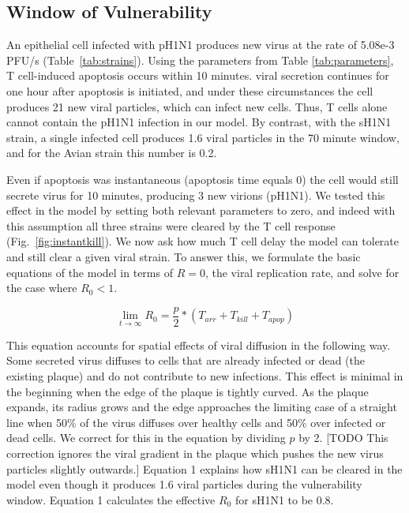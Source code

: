 \documentclass[10pt]{article}
\begin{document}
\subsection*{Window of Vulnerability}

An epithelial cell infected with pH1N1 produces new virus at the rate of 5.08e-3 PFU/s (Table~\ref{tab:strains}).  Using the parameters from Table \ref{tab:parameters}, T cell-induced apoptosis occurs within 10 minutes. viral secretion continues for one hour after apoptosis is initiated, and under these circumstances the cell produces 21 new viral particles, which can infect new cells.  Thus, T cells alone cannot contain the pH1N1 infection in our model.  By contrast, with the sH1N1 strain, a single infected cell produces 1.6 viral particles in the 70 minute window, and for the Avian strain this number is 0.2.  %

Even if apoptosis was instantaneous (apoptosis time equals 0) the cell would still secrete virus for 10 minutes, producing 3 new virions (pH1N1).  We tested this effect in the model by setting both relevant parameters to zero, and indeed with this assumption all three strains were cleared by the T cell response (Fig.~\ref{fig:instantkill}).  We now ask how much T cell delay the model can tolerate and still clear a given viral strain.  To answer this, we formulate the basic equations of the model in terms of $R=0$, the viral replication rate, and solve for the case where $R_0 < 1$.

\begin{equation}
\lim_{t \to \infty} R_0 = \frac{p}{2} * (T_{arr} + T_{kill} + T_{apop})
\end{equation}



This equation accounts for spatial effects of viral diffusion in the following way.  Some secreted virus diffuses to cells that are already infected or dead (the existing plaque) and do not contribute to new infections.  This effect is minimal in the beginning when the edge of the plaque is tightly curved.  As the plaque expands, its radius grows and the edge approaches the limiting case of a straight line when 50\% of the virus diffuses over healthy cells and 50\% over infected or dead cells.  We correct for this in the equation by dividing $p$ by 2.  [TODO This correction ignores the viral gradient in the plaque which pushes the new virus particles slightly outwards.]  Equation 1 explains how sH1N1 can be cleared in the model even though it produces 1.6 viral particles during the vulnerability window.  Equation 1 calculates the effective $R_0$ for sH1N1 to be 0.8.
\end{document}
